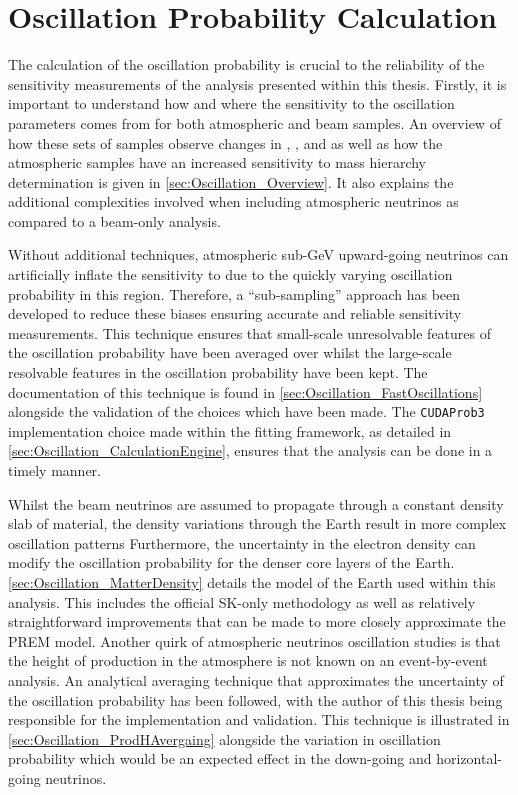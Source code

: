 \chapter{Oscillation Probability Calculation}
\label{chap:OscillationProbability}

The calculation of the oscillation probability is crucial to the reliability of the sensitivity measurements of the analysis presented within this thesis. Firstly, it is important to understand how and where the sensitivity to the oscillation parameters comes from for both atmospheric and beam samples. An overview of how these sets of samples observe changes in \dcp, \delmsqatm, and \sinsqatm as well as how the atmospheric samples have an increased sensitivity to mass hierarchy determination is given in \autoref{sec:Oscillation_Overview}. It also explains the additional complexities involved when including atmospheric neutrinos as compared to a beam-only analysis.

Without additional techniques, atmospheric sub-GeV upward-going neutrinos can artificially inflate the sensitivity to \dcp due to the quickly varying oscillation probability in this region. Therefore, a ``sub-sampling'' approach has been developed to reduce these biases ensuring accurate and reliable sensitivity measurements. This technique ensures that small-scale unresolvable features of the oscillation probability have been averaged over whilst the large-scale resolvable features in the oscillation probability have been kept. The documentation of this technique is found in \autoref{sec:Oscillation_FastOscillations} alongside the validation of the choices which have been made. The \texttt{CUDAProb3} implementation choice made within the fitting framework, as detailed in \autoref{sec:Oscillation_CalculationEngine}, ensures that the analysis can be done in a timely manner.

Whilst the beam neutrinos are assumed to propagate through a constant density slab of material, the density variations through the Earth result in more complex oscillation patterns Furthermore, the uncertainty in the electron density can modify the oscillation probability for the denser core layers of the Earth. \autoref{sec:Oscillation_MatterDensity} details the model of the Earth used within this analysis. This includes the official SK-only methodology as well as relatively straightforward improvements that can be made to more closely approximate the PREM model. Another quirk of atmospheric neutrinos oscillation studies is that the height of production in the atmosphere is not known on an event-by-event analysis. An analytical averaging technique that approximates the uncertainty of the oscillation probability has been followed, with the author of this thesis being responsible for the implementation and validation. This technique is illustrated in \autoref{sec:Oscillation_ProdHAvergaing} alongside the variation in oscillation probability which would be an expected effect in the down-going and horizontal-going neutrinos.


